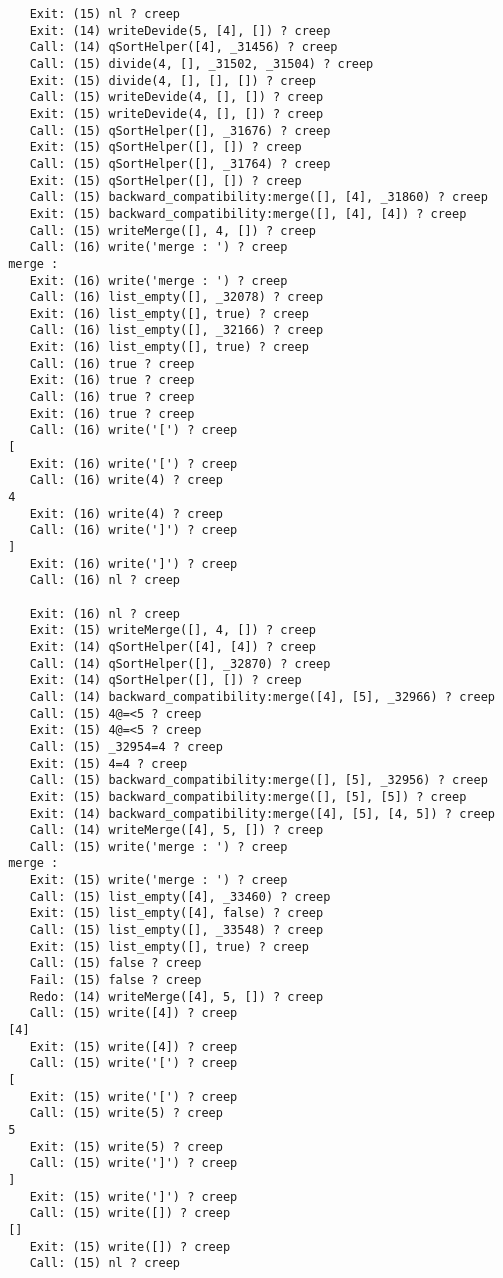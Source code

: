 \documentclass{article}
\begin{document}
\begin{lstlisting}
	Exit: (15) nl ? creep
	Exit: (14) writeDevide(5, [4], []) ? creep
	Call: (14) qSortHelper([4], _31456) ? creep
	Call: (15) divide(4, [], _31502, _31504) ? creep
	Exit: (15) divide(4, [], [], []) ? creep
	Call: (15) writeDevide(4, [], []) ? creep
	Exit: (15) writeDevide(4, [], []) ? creep
	Call: (15) qSortHelper([], _31676) ? creep
	Exit: (15) qSortHelper([], []) ? creep
	Call: (15) qSortHelper([], _31764) ? creep
	Exit: (15) qSortHelper([], []) ? creep
	Call: (15) backward_compatibility:merge([], [4], _31860) ? creep
	Exit: (15) backward_compatibility:merge([], [4], [4]) ? creep
	Call: (15) writeMerge([], 4, []) ? creep
	Call: (16) write('merge : ') ? creep
 merge :
	Exit: (16) write('merge : ') ? creep
	Call: (16) list_empty([], _32078) ? creep
	Exit: (16) list_empty([], true) ? creep
	Call: (16) list_empty([], _32166) ? creep
	Exit: (16) list_empty([], true) ? creep
	Call: (16) true ? creep
	Exit: (16) true ? creep
	Call: (16) true ? creep
	Exit: (16) true ? creep
	Call: (16) write('[') ? creep
 [
	Exit: (16) write('[') ? creep
	Call: (16) write(4) ? creep
 4
	Exit: (16) write(4) ? creep
	Call: (16) write(']') ? creep
 ]
	Exit: (16) write(']') ? creep
	Call: (16) nl ? creep
 
	Exit: (16) nl ? creep
	Exit: (15) writeMerge([], 4, []) ? creep
	Exit: (14) qSortHelper([4], [4]) ? creep
	Call: (14) qSortHelper([], _32870) ? creep
	Exit: (14) qSortHelper([], []) ? creep
	Call: (14) backward_compatibility:merge([4], [5], _32966) ? creep
	Call: (15) 4@=<5 ? creep
	Exit: (15) 4@=<5 ? creep
	Call: (15) _32954=4 ? creep
	Exit: (15) 4=4 ? creep
	Call: (15) backward_compatibility:merge([], [5], _32956) ? creep
	Exit: (15) backward_compatibility:merge([], [5], [5]) ? creep
	Exit: (14) backward_compatibility:merge([4], [5], [4, 5]) ? creep
	Call: (14) writeMerge([4], 5, []) ? creep
	Call: (15) write('merge : ') ? creep
 merge :
	Exit: (15) write('merge : ') ? creep
	Call: (15) list_empty([4], _33460) ? creep
	Exit: (15) list_empty([4], false) ? creep
	Call: (15) list_empty([], _33548) ? creep
	Exit: (15) list_empty([], true) ? creep
	Call: (15) false ? creep
	Fail: (15) false ? creep
	Redo: (14) writeMerge([4], 5, []) ? creep
	Call: (15) write([4]) ? creep
 [4]
	Exit: (15) write([4]) ? creep
	Call: (15) write('[') ? creep
 [
	Exit: (15) write('[') ? creep
	Call: (15) write(5) ? creep
 5
	Exit: (15) write(5) ? creep
	Call: (15) write(']') ? creep
 ]
	Exit: (15) write(']') ? creep
	Call: (15) write([]) ? creep
 []
	Exit: (15) write([]) ? creep
	Call: (15) nl ? creep
 

\end{lstlisting}
\end{document}
